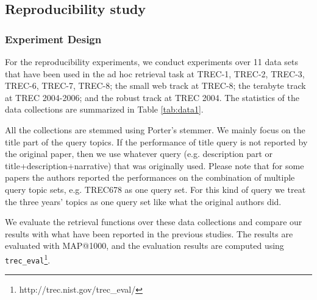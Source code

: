 \subsection{Reproducibility study} 

\subsubsection{Experiment Design} 

For the reproducibility experiments, we conduct experiments over 
11 data sets that have been used in the ad hoc retrieval task at TREC-1, TREC-2, 
TREC-3, TREC-6, TREC-7, TREC-8; the small web track at TREC-8; the terabyte 
track at TREC 2004-2006; and the robust track at TREC 2004. The statistics 
of the data collections are summarized in Table \ref{tab:data1}. 

All the collections are stemmed using Porter's stemmer. 
We mainly focus on the title part of the query topics. 
If the performance of title query is not reported by the original 
paper, then we use whatever query (e.g. description part or 
title+description+narrative) that was originally used. 
Please note that for some papers the authors reported the performances 
on the combination of multiple query topic sets, e.g. TREC678 as one 
query set. For this kind of query we treat the three years' topics 
as one query set like what the original authors did.

We evaluate the retrieval functions over these data collections and 
compare our results with what have been reported in the previous studies.   
The results are evaluated with MAP@1000, and the evaluation 
results are computed using \verb|trec_eval|\footnote{http://trec.nist.gov/trec\_eval/}.


